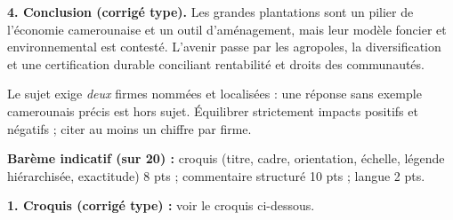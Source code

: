 \documentclass[11pt]{article}
\newcommand{\cle}[1]{{\popxbold\color{popdark}#1}}
\begin{document}
\begin{corrige}
\textbf{4. Conclusion (corrigé type).} Les grandes plantations sont un pilier de l'économie camerounaise et un outil d'aménagement, mais leur modèle foncier et environnemental est contesté. L'avenir passe par les \cle{agropoles}, la diversification et une certification durable conciliant rentabilité et droits des communautés.
\end{corrige}

\begin{attention}
Le sujet exige \emph{deux} firmes nommées et localisées : une réponse sans exemple camerounais précis est hors sujet. Équilibrer strictement impacts positifs et négatifs ; citer au moins un chiffre par firme.
\end{attention}

\begin{corrige}
\textbf{Barème indicatif (sur 20) :} croquis (titre, cadre, orientation, échelle, légende hiérarchisée, exactitude) 8 pts ; commentaire structuré 10 pts ; langue 2 pts.

\textbf{1. Croquis (corrigé type) :} voir le croquis ci-dessous.
\end{corrige}
\end{document}
